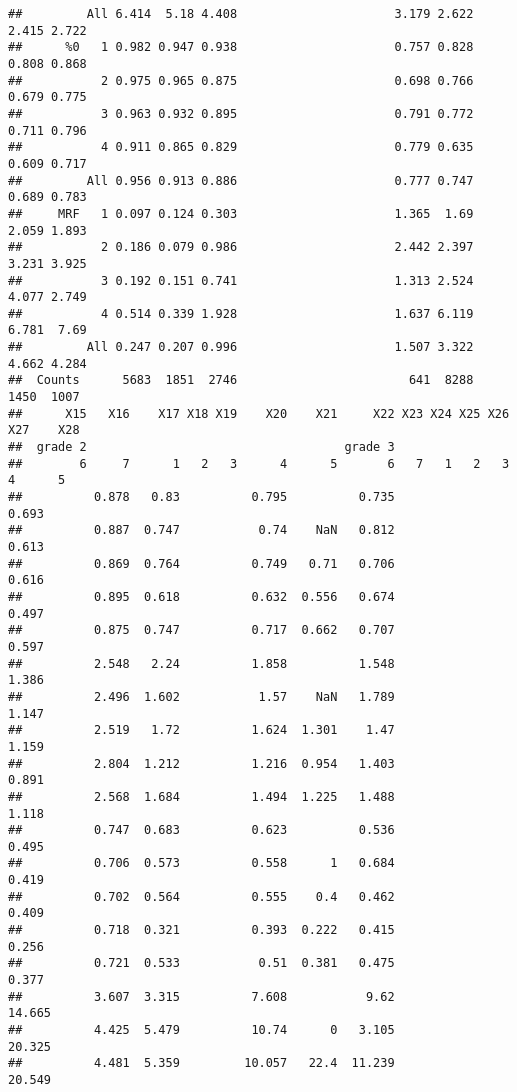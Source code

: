 \documentclass[
]{article}
\begin{document}
\begin{verbatim}
##         All 6.414  5.18 4.408                      3.179 2.622 2.415 2.722
##      %0   1 0.982 0.947 0.938                      0.757 0.828 0.808 0.868
##           2 0.975 0.965 0.875                      0.698 0.766 0.679 0.775
##           3 0.963 0.932 0.895                      0.791 0.772 0.711 0.796
##           4 0.911 0.865 0.829                      0.779 0.635 0.609 0.717
##         All 0.956 0.913 0.886                      0.777 0.747 0.689 0.783
##     MRF   1 0.097 0.124 0.303                      1.365  1.69 2.059 1.893
##           2 0.186 0.079 0.986                      2.442 2.397 3.231 3.925
##           3 0.192 0.151 0.741                      1.313 2.524 4.077 2.749
##           4 0.514 0.339 1.928                      1.637 6.119 6.781  7.69
##         All 0.247 0.207 0.996                      1.507 3.322 4.662 4.284
##  Counts      5683  1851  2746                        641  8288  1450  1007
##      X15   X16    X17 X18 X19    X20    X21     X22 X23 X24 X25 X26 X27    X28
##  grade 2                                    grade 3                           
##        6     7      1   2   3      4      5       6   7   1   2   3   4      5
##          0.878   0.83          0.795          0.735                      0.693
##          0.887  0.747           0.74    NaN   0.812                      0.613
##          0.869  0.764          0.749   0.71   0.706                      0.616
##          0.895  0.618          0.632  0.556   0.674                      0.497
##          0.875  0.747          0.717  0.662   0.707                      0.597
##          2.548   2.24          1.858          1.548                      1.386
##          2.496  1.602           1.57    NaN   1.789                      1.147
##          2.519   1.72          1.624  1.301    1.47                      1.159
##          2.804  1.212          1.216  0.954   1.403                      0.891
##          2.568  1.684          1.494  1.225   1.488                      1.118
##          0.747  0.683          0.623          0.536                      0.495
##          0.706  0.573          0.558      1   0.684                      0.419
##          0.702  0.564          0.555    0.4   0.462                      0.409
##          0.718  0.321          0.393  0.222   0.415                      0.256
##          0.721  0.533           0.51  0.381   0.475                      0.377
##          3.607  3.315          7.608           9.62                     14.665
##          4.425  5.479          10.74      0   3.105                     20.325
##          4.481  5.359         10.057   22.4  11.239                     20.549

\end{verbatim}
\end{document}

